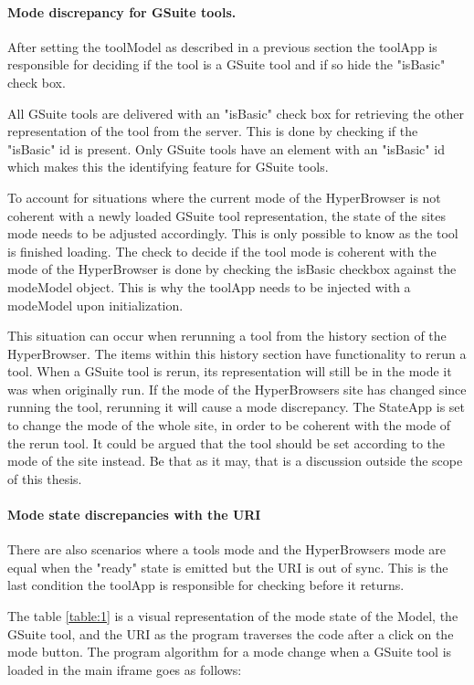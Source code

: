\documentclass[english]{ifimaster}
\begin{document}
\paragraph{Mode discrepancy for GSuite tools.}
\label{sec:gsuiteMode}
After setting the toolModel as described in a previous section the toolApp is responsible for deciding if the tool is a GSuite tool and if so hide the "isBasic" check box. 

All GSuite tools are delivered with an "isBasic" check box for retrieving the other representation of the tool from the server. This is done by checking if the "isBasic" id is present. Only GSuite tools have an element with an "isBasic" id which makes this the identifying feature for GSuite tools.


To account for situations where the current mode of the HyperBrowser is not coherent with a newly loaded GSuite tool representation, the state of the sites mode needs to be adjusted accordingly. This is only possible to know as the tool is finished loading. The check to decide if the tool mode is coherent with the mode of the HyperBrowser is done by checking the isBasic checkbox against the modeModel object. This is why the toolApp needs to be injected with a modeModel upon initialization. 

This situation can occur when rerunning a tool from the history section of the HyperBrowser. The items within this history section have functionality to rerun a tool. When a GSuite tool is rerun, its representation will still be in the mode it was when originally run. If the mode of the HyperBrowsers site has changed since running the tool, rerunning it will cause a mode discrepancy. The StateApp is set to change the mode of the whole site, in order to be coherent with the mode of the rerun tool. It could be argued that the tool should be set according to the mode of the site instead. Be that as it may, that is a discussion outside the scope of this thesis.

\paragraph{Mode state discrepancies with the URI }
There are also scenarios where a tools mode and the HyperBrowsers mode are equal when the "ready" state is emitted but the URI is out of sync. This is the last condition the toolApp is responsible for checking before it returns.


The table \ref{table:1} is a visual representation of the mode state of the Model, the GSuite tool, and the URI as the program traverses the code after a click on the mode button. The program algorithm for a mode change when a GSuite tool is loaded in the main iframe goes as follows:
\end{document}
